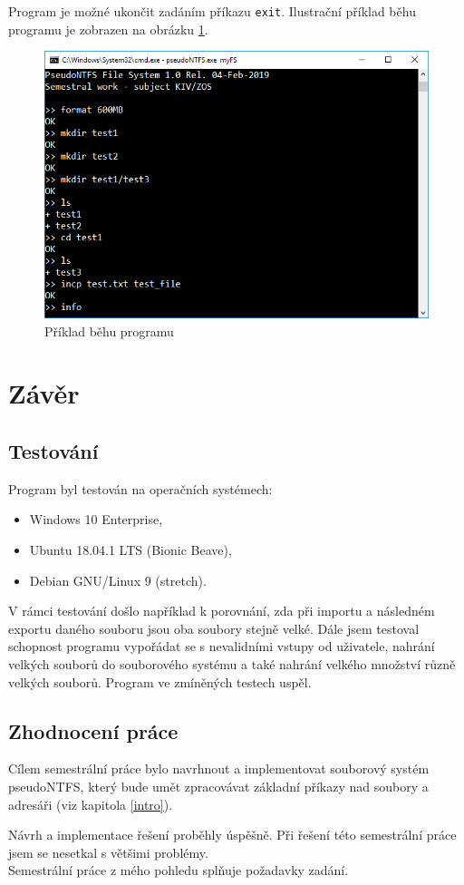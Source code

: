 \documentclass[
11pt,
a4paper,
pdftex,
czech,
titlepage
]{report}
\begin{document}
Program je možné ukončit zadáním příkazu \texttt{exit}. Ilustrační příklad běhu programu je zobrazen na obrázku \ref{run_prog}.

\begin{figure}[!ht]
	\centering
	\includegraphics[width=1\textwidth]{img/run_prog.png}
	\caption{Příklad běhu programu}
	\label{run_prog}
\end{figure}


\chapter{Závěr}
\section{Testování}
Program byl testován na operačních systémech: 
\begin{itemize}
\item Windows 10 Enterprise,
\item Ubuntu 18.04.1 LTS (Bionic Beave),
\item Debian GNU/Linux 9 (stretch).\\
\end{itemize}

\noindent V rámci testování došlo například k porovnání, zda při importu a následném exportu daného souboru jsou oba soubory stejně velké. Dále jsem testoval schopnost programu vypořádat se s nevalidními vstupy od uživatele, nahrání velkých souborů do souborového systému a také nahrání velkého množství různě velkých souborů. Program ve zmíněných testech uspěl. 


\section{Zhodnocení práce}
Cílem semestrální práce bylo navrhnout a implementovat souborový systém pseudoNTFS, který bude umět zpracovávat základní příkazy nad soubory a adresáři (viz kapitola \ref{intro}).

Návrh a implementace řešení proběhly úspěšně. Při řešení této semestrální práce jsem se nesetkal s většimi problémy.\\

\noindent Semestrální práce z mého pohledu splňuje požadavky zadání.
\end{document}
